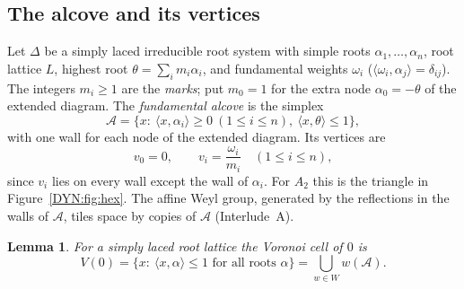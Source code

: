 \documentclass[11pt,openany]{book}
\theoremstyle{plain}
\newtheorem{lemma}[theorem]{Lemma}
\theoremstyle{definition}
\theoremstyle{remark}
\newcommand{\ip}[2]{\langle #1, #2\rangle}
\begin{document}
\subsection*{The alcove and its vertices}
Let $\Delta$ be a simply laced irreducible root system with simple roots $\alpha_1,\dots,\alpha_n$, root
lattice $L$, highest root $\theta=\sum_im_i\alpha_i$, and fundamental weights $\omega_i$
($\ip{\omega_i}{\alpha_j}=\delta_{ij}$). The integers $m_i\ge1$ are the \emph{marks}; put $m_0=1$ for the
extra node $\alpha_0=-\theta$ of the extended diagram. The \emph{fundamental alcove} is the simplex
\[
  \mathcal A=\{x:\ \ip x{\alpha_i}\ge0\ (1\le i\le n),\ \ip x\theta\le1\},
\]
with one wall for each node of the extended diagram. Its vertices are
\[
  v_0=0,\qquad v_i=\frac{\omega_i}{m_i}\quad(1\le i\le n),
\]
since $v_i$ lies on every wall except the wall of $\alpha_i$. For $A_2$ this is the triangle in
Figure~\ref{DYN:fig:hex}. The affine Weyl group, generated by the reflections in the walls of
$\mathcal A$, tiles space by copies of $\mathcal A$ (Interlude~A).

\begin{lemma}\label{DYN:lem:relevant}
For a simply laced root lattice the Voronoi cell of $0$ is
\[
  V(0)=\{x:\ \ip x\alpha\le1\text{ for all roots }\alpha\}=\bigcup_{w\in W}w(\mathcal A).
\]
\end{lemma}
\end{document}
